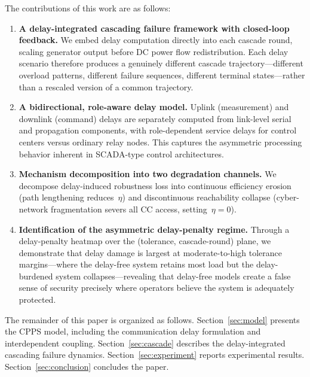 \documentclass[a4paper,fleqn]{cas-dc}
\begin{document}
The contributions of this work are as follows:

\begin{enumerate}
\item \textbf{A delay-integrated cascading failure framework with
  closed-loop feedback.}  We embed delay computation directly into each
  cascade round, scaling generator output before DC power flow
  redistribution.  Each delay scenario therefore produces a genuinely
  different cascade trajectory---different overload patterns, different
  failure sequences, different terminal states---rather than a rescaled
  version of a common trajectory.

\item \textbf{A bidirectional, role-aware delay model.}  Uplink
  (measurement) and downlink (command) delays are separately computed
  from link-level serial and propagation components, with
  role-dependent service delays for control centers versus ordinary
  relay nodes.  This captures the asymmetric processing behavior
  inherent in SCADA-type control architectures.

\item \textbf{Mechanism decomposition into two degradation channels.}
  We decompose delay-induced robustness loss into continuous efficiency
  erosion (path lengthening reduces~$\eta$) and discontinuous
  reachability collapse (cyber-network fragmentation severs all CC
  access, setting~$\eta=0$).

\item \textbf{Identification of the asymmetric delay-penalty regime.}
  Through a delay-penalty heatmap over the (tolerance, cascade-round)
  plane, we demonstrate that delay damage is largest at moderate-to-high
  tolerance margins---where the delay-free system retains most load but
  the delay-burdened system collapses---revealing that delay-free models
  create a false sense of security precisely where operators believe the
  system is adequately protected.
\end{enumerate}

The remainder of this paper is organized as follows.
Section~\ref{sec:model} presents the CPPS model, including the
communication delay formulation and interdependent coupling.
Section~\ref{sec:cascade} describes the delay-integrated cascading
failure dynamics.  Section~\ref{sec:experiment} reports experimental
results.  Section~\ref{sec:conclusion} concludes the paper.


\end{document}
